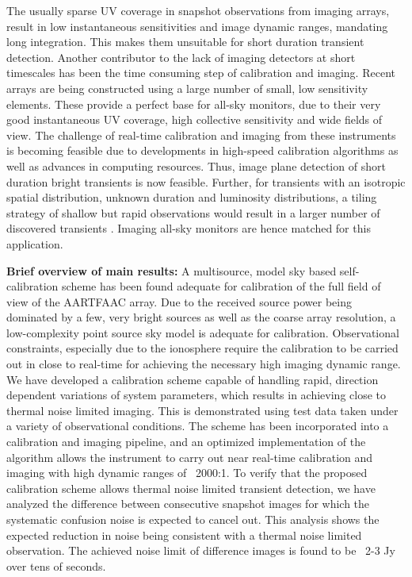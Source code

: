 \documentclass{aa}
\begin{document}
The usually  sparse UV  coverage in snapshot  observations from  imaging arrays,
result in  low instantaneous sensitivities  and image dynamic  ranges, mandating
long  integration.  This makes  them  unsuitable  for  short duration  transient
detection.   Another contributor  to  the  lack of  imaging  detectors at  short
timescales has been  the time consuming step of  calibration and imaging. Recent
arrays  are being constructed  using a  large number  of small,  low sensitivity
elements. These provide  a perfect base for all-sky monitors,  due to their very
good instantaneous UV  coverage, high collective sensitivity and  wide fields of
view.  The challenge of real-time calibration and imaging from these instruments
is becoming feasible due to developments in high-speed calibration algorithms as
well as advances  in computing resources.  Thus, image  plane detection of short
duration  bright transients  is now  feasible. Further,  for transients  with an
isotropic spatial distribution, unknown duration and luminosity distributions, a
tiling  strategy of  shallow but  rapid observations  would result  in  a larger
number  of  discovered transients  \citep  {nemiroff2003tile}.  Imaging  all-sky
monitors are hence matched for this application.


\textbf{Brief  overview  of  main  results:}  A  multisource,  model  sky  based
self-calibration  scheme has  been found  adequate for  calibration of  the full
field of  view of the  AARTFAAC array.  Due  to the received source  power being
dominated by a few, very bright  sources as well as the coarse array resolution,
a  low-complexity   point  source  sky   model  is  adequate   for  calibration.
Observational  constraints,  especially  due   to  the  ionosphere  require  the
calibration to be carried out in  close to real-time for achieving the necessary
high imaging dynamic  range.  We have developed a  calibration scheme capable of
handling  rapid,  direction dependent  variations  of  system parameters,  which
results  in  achieving   close  to  thermal  noise  limited   imaging.  This  is
demonstrated using test data taken  under a variety of observational conditions.
The scheme has been incorporated into a calibration and imaging pipeline, and an
optimized implementation  of the  algorithm allows the  instrument to  carry out
near real-time calibration and imaging  with high dynamic ranges of ~2000:1.  To
verify  that  the  proposed  calibration  scheme allows  thermal  noise  limited
transient  detection,  we  have  analyzed  the  difference  between  consecutive
snapshot images for  which the systematic confusion noise  is expected to cancel
out. This analysis shows the expected reduction in noise being consistent with a
thermal noise limited observation. The achieved noise limit of difference images
is found to be ~2-3 Jy over tens of seconds.
 
\end{document}

